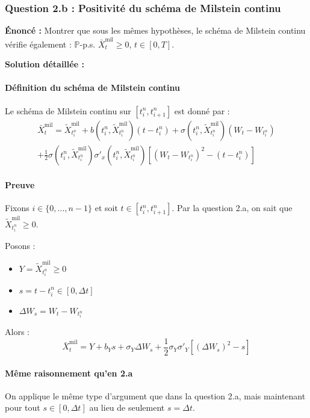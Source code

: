 \documentclass[12pt,a4paper]{article}
\theoremstyle{definition}
\theoremstyle{remark}
\newcommand{\Prob}{\mathbb{P}}
\begin{document}
\subsubsection{Question 2.b : Positivité du schéma de Milstein continu}

\textbf{Énoncé :} Montrer que sous les mêmes hypothèses, le schéma de Milstein continu vérifie également : $\Prob$-p.s. $\bar{X}_t^{\text{mil}} \geq 0$, $t \in [0,T]$.

\textbf{Solution détaillée :}

\paragraph{Définition du schéma de Milstein continu}
Le schéma de Milstein continu sur $[t_i^n, t_{i+1}^n]$ est donné par :
\begin{multline}
\bar{X}_t^{\text{mil}} = \tilde{X}_{t_i^n}^{\text{mil}} + b(t_i^n, \tilde{X}_{t_i^n}^{\text{mil}})(t - t_i^n) + \sigma(t_i^n, \tilde{X}_{t_i^n}^{\text{mil}})(W_t - W_{t_i^n}) \\
+ \frac{1}{2}\sigma(t_i^n, \tilde{X}_{t_i^n}^{\text{mil}})\sigma'_x(t_i^n, \tilde{X}_{t_i^n}^{\text{mil}})[(W_t - W_{t_i^n})^2 - (t - t_i^n)]
\end{multline}

\paragraph{Preuve}
Fixons $i \in \{0,\ldots,n-1\}$ et soit $t \in [t_i^n, t_{i+1}^n]$. Par la question 2.a, on sait que $\tilde{X}_{t_i^n}^{\text{mil}} \geq 0$.

Posons :
\begin{itemize}
\item $Y = \tilde{X}_{t_i^n}^{\text{mil}} \geq 0$
\item $s = t - t_i^n \in [0, \Delta t]$
\item $\Delta W_s = W_t - W_{t_i^n}$
\end{itemize}

Alors :
\begin{equation}
\bar{X}_t^{\text{mil}} = Y + b_Y s + \sigma_Y \Delta W_s + \frac{1}{2}\sigma_Y \sigma'_Y [(\Delta W_s)^2 - s]
\end{equation}

\paragraph{Même raisonnement qu'en 2.a}
On applique le même type d'argument que dans la question 2.a, mais maintenant pour tout $s \in [0, \Delta t]$ au lieu de seulement $s = \Delta t$.
\end{document}

